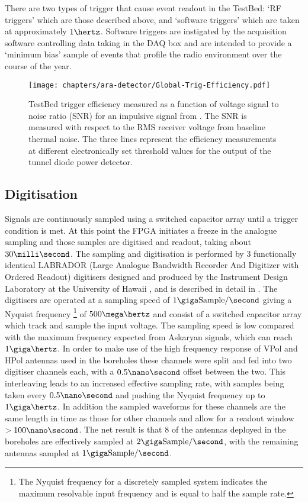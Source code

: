 There are two types of trigger that cause event readout in the TestBed: `RF triggers' which are those described above, and `software triggers' which are taken at approximately $1 \hertz$. Software triggers are instigated by the acquisition software controlling data taking in the DAQ box and are intended to provide a `minimum bias' sample of events that profile the radio environment over the course of the year.

\begin{figure}[htpb]
  \centering
  \texttt{[image: chapters/ara-detector/Global-Trig-Efficiency.pdf]}
  \caption{TestBed trigger efficiency measured as a function of voltage signal to noise ratio (SNR) for an impulsive signal from \cite{Allison2012457}. The SNR is measured with respect to the RMS receiver voltage from baseline thermal noise. The three lines represent the efficiency measurements at different electronically set threshold values for the output of the tunnel diode power detector.}
  \label{fig:ara-detector:TestBed:Trigger-Efficiency}
\end{figure}


\subsection{Digitisation}
\label{sec:ara-detector:TestBed:Digitisation}

Signals are continuously sampled using a switched capacitor array until a trigger condition is met. At this point the FPGA initiates a freeze in the analogue sampling and those samples are digitised and readout, taking about $30 \milli \second$. The sampling and digitisation is performed by 3 functionally identical LABRADOR (Large Analogue Bandwidth Recorder And Digitizer with Ordered Readout) digitisers designed and produced by the Instrument Design Laboratory at the University of Hawaii \cite{Varner2007447}, and is described in detail in . The digitisers are operated at a sampling speed of $1 \giga \mbox{Sample} /\second$ giving a Nyquist frequency \footnote{The Nyquist frequency for a discretely sampled system indicates the maximum resolvable input frequency and is equal to half the sample rate.} of $500 \mega \hertz$ and consist of a switched capacitor array which track and sample the input voltage. The sampling speed is low compared with the maximum frequency expected from Askaryan signals, which can reach $1 \giga \hertz$. In order to make use of the high frequency response of VPol and HPol antennas used in the boreholes these channels were split and fed into two digitiser channels each, with a $0.5 \nano \second$ offset between the two. This interleaving leads to an increased effective sampling rate, with samples being taken every $0.5 \nano \second$ and pushing the Nyquist frequency up to $1 \giga \hertz$. In addition the sampled waveforms for these channels are the same length in time as those for other channels and allow for a readout window $> 100 \nano \second$. The net result is that 8 of the antennas deployed in the boreholes are effectively sampled at $2 \giga \mbox{Sample} /\second$, with the remaining antennas sampled at $1 \giga \mbox{Sample} /\second$.

